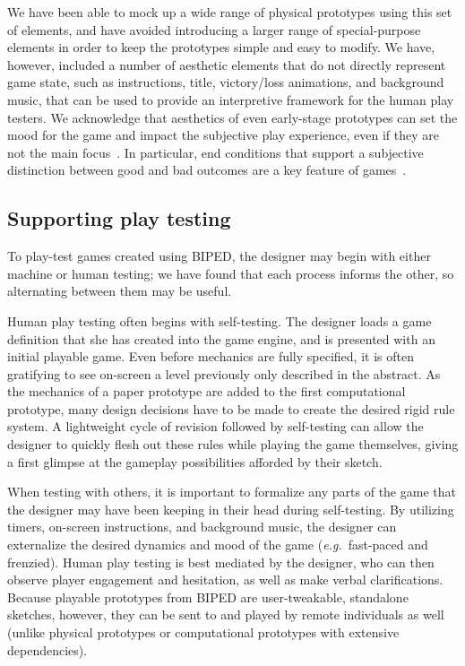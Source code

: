 \documentclass[letterpaper]{article}
\begin{document}
We have been able to mock up a wide range of physical prototypes using this set
of elements, and have avoided introducing a larger range of special-purpose
elements in order to keep the prototypes simple and easy to
modify. We have, however, included a number of aesthetic elements that do not
directly represent game state, such as instructions, title, victory/loss
animations, and background music, that can be used to provide an interpretive
framework for the human play testers. We acknowledge that aesthetics of even
early-stage prototypes can set the mood for the game and impact the subjective
play experience, even if they are not the main focus~\cite{Sigman:Gamasutra}. In
particular, end conditions that support a subjective distinction between good
and bad outcomes are a key feature of games~\cite{Juul:Gameness}.

\subsection{Supporting play testing}

To play-test games created using BIPED, the designer may begin with either
machine or human testing; we have found that each process informs the
other, so alternating between them may be useful.

Human play testing often begins with self-testing. The designer loads a game
definition that she has created into the game engine, and is presented with an
initial playable game. Even before mechanics are fully specified, it is often
gratifying to see on-screen a level previously only described in the abstract.
As the mechanics of a paper prototype are added to the first computational
prototype, many design decisions have to be made to create the desired rigid
rule system. A lightweight cycle of revision followed by self-testing can allow
the designer to quickly flesh out these rules while playing the game
themselves, giving a first glimpse at the gameplay possibilities afforded by
their sketch.

When testing with others, it is important to formalize any parts of the game
that the designer may have been keeping in their head during self-testing.  By
utilizing timers, on-screen instructions, and background music, the designer
can externalize the desired dynamics and mood of the game (\emph{e.g.}\
fast-paced and frenzied). Human play testing is best mediated by the designer,
who can then observe player engagement and hesitation, as well as make verbal
clarifications. Because playable prototypes from BIPED are user-tweakable,
standalone sketches, however, they can be sent to and played by remote individuals
as well (unlike physical prototypes or computational prototypes with extensive
dependencies).
\end{document}
